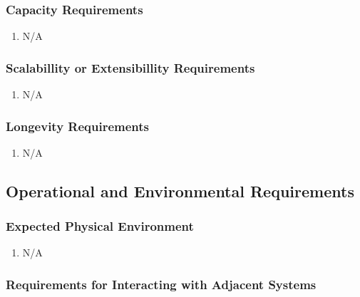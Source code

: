 \documentclass[12pt, titlepage]{article}
\begin{document}
\color{red}

\subsubsection{Capacity Requirements}

\begin{enumerate}[label=CR\arabic*:, wide=0pt, leftmargin=*]
    \item N/A
\end{enumerate}

\subsubsection{Scalabillity or Extensibillity Requirements}

\begin{enumerate}[label=SER\arabic*:, wide=0pt, leftmargin=*]
    \item N/A
\end{enumerate}

\subsubsection{Longevity Requirements}

\begin{enumerate}[label=LOR\arabic*:, wide=0pt, leftmargin=*]
    \item N/A
\end{enumerate}

\color{black}

\subsection{Operational and Environmental Requirements}

\color{red}

\subsubsection{Expected Physical Environment}

\begin{enumerate}[label=EVE\arabic*:, wide=0pt, leftmargin=*]
    \item N/A
\end{enumerate}

\color{black}

\subsubsection{Requirements for Interacting with Adjacent Systems}
\end{document}
